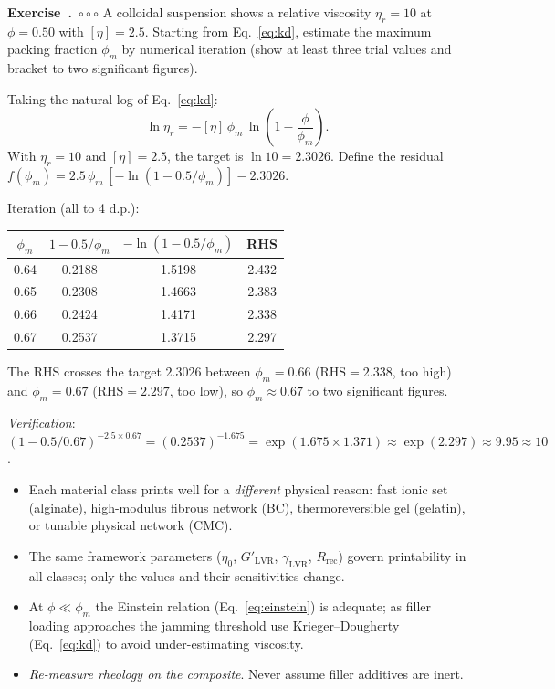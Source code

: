 \documentclass[11pt,a4paper]{article}
\newcommand{\diffC}{\textcolor{red!70!black}{$\circ\circ\circ$}}
\newcounter{exidx}[section]
\renewcommand{\theexidx}{\thesection.\arabic{exidx}}
\newenvironment{exercise}[1]%
  {\par\smallskip\refstepcounter{exidx}%
   \noindent\textbf{Exercise~\theexidx}~#1\quad}
  {\par\smallskip}
\begin{document}
\begin{exercise}{\diffC}
A colloidal suspension shows a relative viscosity $\eta_r=10$ at
$\phi=0.50$ with $[\eta]=2.5$.  Starting from Eq.~\ref{eq:kd}, estimate
the maximum packing fraction $\phi_m$ by numerical iteration (show at
least three trial values and bracket to two significant figures).
\begin{solution}
Taking the natural log of Eq.~\ref{eq:kd}:
\[
\ln\eta_r = -[\eta]\,\phi_m\,\ln\!\left(1-\frac{\phi}{\phi_m}\right).
\]
With $\eta_r=10$ and $[\eta]=2.5$, the target is
$\ln 10 = 2.3026$.  Define the residual
$f(\phi_m)=2.5\,\phi_m\,[-\ln(1-0.5/\phi_m)]-2.3026$.

Iteration (all to 4 d.p.):
\begin{center}
\small
\begin{tabular}{cccc}
\toprule
$\phi_m$ & $1-0.5/\phi_m$ & $-\ln(1-0.5/\phi_m)$ & RHS\\
\midrule
0.64 & 0.2188 & 1.5198 & 2.432\\
0.65 & 0.2308 & 1.4663 & 2.383\\
0.66 & 0.2424 & 1.4171 & 2.338\\
0.67 & 0.2537 & 1.3715 & 2.297\\
\bottomrule
\end{tabular}
\end{center}
The RHS crosses the target $2.3026$ between $\phi_m=0.66$ (RHS$=2.338$,
too high) and $\phi_m=0.67$ (RHS$=2.297$, too low), so
$\phi_m\approx\mathbf{0.67}$ to two significant figures.

\emph{Verification}: $(1-0.5/0.67)^{-2.5\times 0.67}=(0.2537)^{-1.675}
=\exp(1.675\times 1.371)\approx\exp(2.297)\approx9.95\approx10$. \checkmark
\end{solution}
\end{exercise}

\begin{takeawaybox}
\begin{itemize}[leftmargin=1.4em,itemsep=2pt]
\item Each material class prints well for a \emph{different} physical
  reason: fast ionic set (alginate), high-modulus fibrous network (BC),
  thermoreversible gel (gelatin), or tunable physical network (CMC).
\item The same framework parameters ($\eta_0$, $G'_\mathrm{LVR}$,
  $\gamma_\mathrm{LVR}$, $R_\mathrm{rec}$) govern printability in all
  classes; only the values and their sensitivities change.
\item At $\phi\ll\phi_m$ the Einstein relation (Eq.~\ref{eq:einstein})
  is adequate; as filler loading approaches the jamming threshold use
  Krieger--Dougherty (Eq.~\ref{eq:kd}) to avoid under-estimating
  viscosity.
\item \emph{Re-measure rheology on the composite}. Never assume filler
  additives are inert.
\end{itemize}
\end{takeawaybox}
\end{document}
